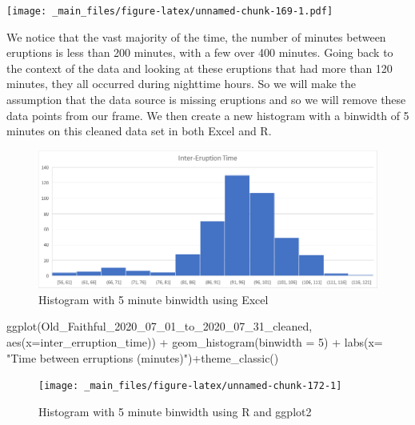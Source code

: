 \documentclass[
]{book}
\newenvironment{Shaded}{\begin{snugshade}}{\end{snugshade}}
\newcommand{\AttributeTok}[1]{\textcolor[rgb]{0.77,0.63,0.00}{#1}}
\newcommand{\DecValTok}[1]{\textcolor[rgb]{0.00,0.00,0.81}{#1}}
\newcommand{\FunctionTok}[1]{\textcolor[rgb]{0.00,0.00,0.00}{#1}}
\newcommand{\NormalTok}[1]{#1}
\newcommand{\SpecialCharTok}[1]{\textcolor[rgb]{0.00,0.00,0.00}{#1}}
\newcommand{\StringTok}[1]{\textcolor[rgb]{0.31,0.60,0.02}{#1}}
\theoremstyle{definition}
\theoremstyle{definition}
\theoremstyle{definition}
\theoremstyle{definition}
\theoremstyle{remark}
\begin{document}
\texttt{[image: \_main\_files/figure-latex/unnamed-chunk-169-1.pdf]}

We notice that the vast majority of the time, the number of minutes between eruptions is less than 200 minutes, with a few over 400 minutes. Going back to the context of the data and looking at these eruptions that had more than 120 minutes, they all occurred during nighttime hours. So we will make the assumption that the data source is missing eruptions and so we will remove these data points from our frame. We then create a new histogram with a binwidth of 5 minutes on this cleaned data set in both Excel and R.

\begin{figure}

{\centering \includegraphics[width=0.9\linewidth]{data-examples/Old-Faithful/Eruption_Hist2_Excel} 

}

\caption{Histogram with 5 minute binwidth using Excel}\label{fig:unnamed-chunk-170}
\end{figure}

\begin{Shaded}
\begin{Highlighting}[]
\FunctionTok{ggplot}\NormalTok{(Old\_Faithful\_2020\_07\_01\_to\_2020\_07\_31\_cleaned, }\FunctionTok{aes}\NormalTok{(}\AttributeTok{x=}\NormalTok{inter\_erruption\_time)) }\SpecialCharTok{+} \FunctionTok{geom\_histogram}\NormalTok{(}\AttributeTok{binwidth =} \DecValTok{5}\NormalTok{) }\SpecialCharTok{+} \FunctionTok{labs}\NormalTok{(}\AttributeTok{x=} \StringTok{"Time between erruptions (minutes)"}\NormalTok{)}\SpecialCharTok{+}\FunctionTok{theme\_classic}\NormalTok{()}
\end{Highlighting}
\end{Shaded}

\begin{figure}

{\centering \texttt{[image: \_main\_files/figure-latex/unnamed-chunk-172-1]} 

}

\caption{Histogram with 5 minute binwidth using R and ggplot2}\label{fig:unnamed-chunk-172}
\end{figure}
\end{document}
